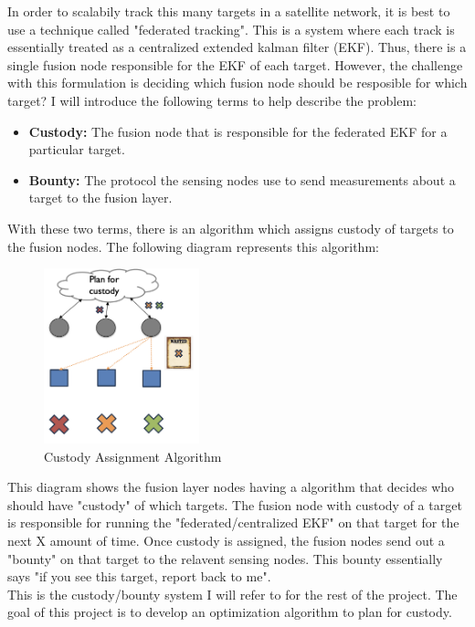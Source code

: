 \documentclass{article}
\begin{document}
    In order to scalabily track this many targets in a satellite network, it is best to use a technique called "federated tracking". This is a system where each track is essentially treated as a centralized extended kalman filter (EKF). Thus, there is a single fusion node responsible for the EKF of each target.
    However, the challenge with this formulation is deciding which fusion node should be resposible for which target? I will introduce the following terms to help describe the problem:
    \begin{itemize}
        \item \textbf{Custody:} The fusion node that is responsible for the federated EKF for a particular target.
        \item \textbf{Bounty:} The protocol the sensing nodes use to send measurements about a target to the fusion layer.
    \end{itemize}

    With these two terms, there is an algorithm which assigns custody of targets to the fusion nodes. The following diagram represents this algorithm:

    \begin{figure}[h]
        \centering
        \includegraphics[width=0.4\textwidth]{images/custody_algo.png}
        \caption{Custody Assignment Algorithm}
        \label{fig:custody_algo}
    \end{figure}

    \vspace{4cm} %

    This diagram shows the fusion layer nodes having a algorithm that decides who should have "custody" of which targets. The fusion node with custody of a target is responsible for running the "federated/centralized EKF" on that target for the next X amount of time. Once custody is assigned, the fusion nodes send out a "bounty" on that target to the relavent sensing nodes. This bounty essentially says "if you see this target, report back to me". \\
    This is the custody/bounty system I will refer to for the rest of the project. The goal of this project is to develop an optimization algorithm to plan for custody. \\
\end{document}
